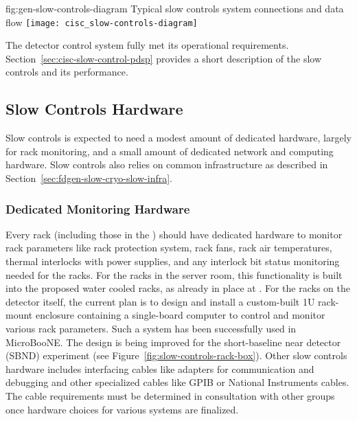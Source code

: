 \begin{dunefigure}{fig:gen-slow-controls-diagram}
{Typical slow controls system connections and data flow}
\texttt{[image: cisc\_slow-controls-diagram]}
\end{dunefigure}

The  detector control system\cite{pdspdcs_proc} fully met its operational requirements. %
Section~\ref{sec:cisc-slow-control-pdsp} provides a short description of the  slow controls and its performance.

 \subsection{Slow Controls Hardware}
\label{sec:fdgen-slow-cryo-hdwr}

Slow controls is expected to need a modest amount of dedicated hardware, largely for rack monitoring,  %
and a small amount of dedicated network and
computing hardware. %
Slow controls also relies on common
infrastructure as described in
Section~\ref{sec:fdgen-slow-cryo-slow-infra}.

\subsubsection{Dedicated Monitoring Hardware}

Every rack (including those in the ) should have dedicated hardware to monitor rack parameters like rack protection system, rack fans, rack air temperatures, thermal interlocks with power supplies, and any interlock bit status monitoring needed for the racks. For the racks in the  server room, this functionality is built into the proposed water cooled racks, as already in place at .  For the racks on the detector itself, the current plan is to design and install a custom-built 1U rack-mount enclosure containing a single-board computer to control and monitor various rack parameters. Such a system has been successfully used in MicroBooNE. The design is being improved for the short-baseline near detector (SBND) experiment (see Figure~\ref{fig:slow-controls-rack-box}). Other slow controls hardware includes interfacing cables like adapters for communication and debugging and other specialized cables like GPIB or National Instruments cables. The cable requirements must be determined in consultation with other groups once hardware choices for various systems are finalized.

